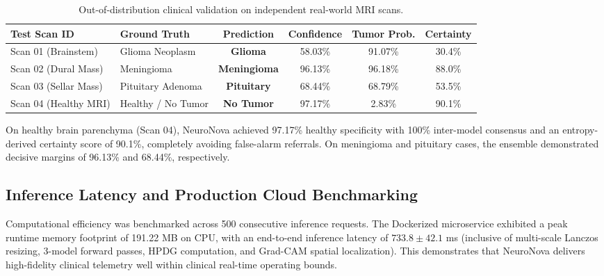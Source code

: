 \documentclass[runningheads]{llncs}
\begin{document}
\begin{table}[t]
\centering
\caption{Out-of-distribution clinical validation on independent real-world MRI scans.}
\label{tab:ood}
\begin{tabular}{llcccc}
\toprule
\textbf{Test Scan ID} & \textbf{Ground Truth} & \textbf{Prediction} & \textbf{Confidence} & \textbf{Tumor Prob.} & \textbf{Certainty} \\
\midrule
Scan 01 (Brainstem)    & Glioma Neoplasm       & \textbf{Glioma}     & 58.03\%             & 91.07\%              & 30.4\% \\
Scan 02 (Dural Mass)   & Meningioma            & \textbf{Meningioma} & 96.13\%             & 96.18\%              & 88.0\% \\
Scan 03 (Sellar Mass)  & Pituitary Adenoma     & \textbf{Pituitary}  & 68.44\%             & 68.79\%              & 53.5\% \\
Scan 04 (Healthy MRI)  & Healthy / No Tumor    & \textbf{No Tumor}   & 97.17\%             & 2.83\%               & 90.1\% \\
\bottomrule
\end{tabular}
\end{table}

On healthy brain parenchyma (Scan 04), NeuroNova achieved 97.17\% healthy specificity with 100\% inter-model consensus and an entropy-derived certainty score of 90.1\%, completely avoiding false-alarm referrals. On meningioma and pituitary cases, the ensemble demonstrated decisive margins of 96.13\% and 68.44\%, respectively.

\subsection{Inference Latency and Production Cloud Benchmarking}
Computational efficiency was benchmarked across 500 consecutive inference requests. The Dockerized microservice exhibited a peak runtime memory footprint of 191.22 MB on CPU, with an end-to-end inference latency of $733.8 \pm 42.1$ ms (inclusive of multi-scale Lanczos resizing, 3-model forward passes, HPDG computation, and Grad-CAM spatial localization). This demonstrates that NeuroNova delivers high-fidelity clinical telemetry well within clinical real-time operating bounds.

\end{document}
